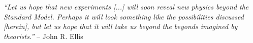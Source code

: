 
\begin{dedication} 


\textit{``Let us hope that new experiments [...] will soon reveal new physics beyond the Standard Model. Perhaps it will look something like the possibilities discussed [herein], but let us hope that it will take us beyond the beyonds imagined by theorists.''
} -- John R. Ellis


\end{dedication}

